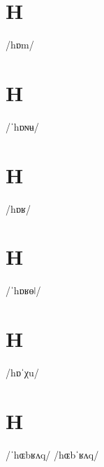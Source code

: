 \documentclass[10pt,a4paper,twoside]{book}
\begin{document}
\section*{H}

\begin{multicols}{3}
 {/hɒm/} {}
\end{multicols}

\section*{H}

\begin{multicols}{3}
 {/ˈhɒɴʉ/} {}
\end{multicols}

\section*{H}

\begin{multicols}{3}
 {/hɒʁ/} {}
\end{multicols}

\section*{H}

\begin{multicols}{3}
 {/ˈhɒʁɵǀ/} {}
\end{multicols}

\section*{H}

\begin{multicols}{3}
 {/hɒˈχu/} {}
\end{multicols}

\section*{H}

\begin{multicols}{3}
 {/ˈhɶbʁʌq/} {}
 {/hɶbˈʁʌq/} {}
\end{multicols}
\end{document}
